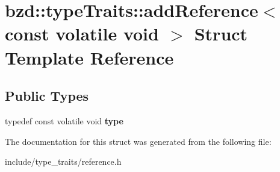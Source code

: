 \hypertarget{structbzd_1_1typeTraits_1_1addReference_3_01const_01volatile_01void_01_4}{}\section{bzd\+:\+:type\+Traits\+:\+:add\+Reference$<$ const volatile void $>$ Struct Template Reference}
\label{structbzd_1_1typeTraits_1_1addReference_3_01const_01volatile_01void_01_4}
\subsection*{Public Types}
\begin{DoxyCompactItemize}
\item 
\mbox{\label{structbzd_1_1typeTraits_1_1addReference_3_01const_01volatile_01void_01_4_af070d6047a22af91a1c1086e7bb6ab9e}} 
typedef const volatile void {\bfseries type}
\end{DoxyCompactItemize}


The documentation for this struct was generated from the following file\+:\begin{DoxyCompactItemize}
\item 
include/type\+\_\+traits/reference.\+h\end{DoxyCompactItemize}
